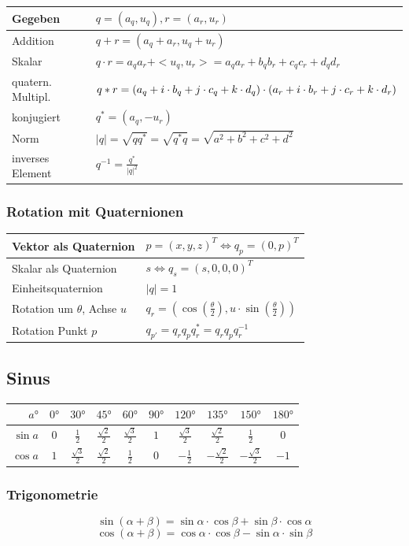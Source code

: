 \documentclass[8pt,a4paper,landscape]{scrartcl}
\begin{document}
\begin{multicols*}{3}
\begin{tabularx}{\columnwidth}{m{}|>{\raggedright\arraybackslash}X}
	Gegeben & $ q = (a_q, u_q), r=(a_r, u_r) $\\ \hline
	Addition & $ q + r = (a_q + a_r, u_q + u_r) $\\ \hline
	Skalar & $ q \cdot r = a_qa_r + <u_q, u_r> = a_qa_r + b_qb_r + c_qc_r +d_qd_r $\\ \hline
	quatern. Multipl. & $  q*r = \newline (a_q+i\cdot b_q + j\cdot c_q + k\cdot d_q)\cdot (a_r + i\cdot b_r + j\cdot c_r + k\cdot d_r) $\\ \hline
	konjugiert & $ q^{*} = (a_q, -u_r) $\\ \hline
	Norm & $ |q| = \sqrt{qq^{*}} = \sqrt{q^{*}q} = \sqrt{a^2+b^2+c^2+d^2} $\\ \hline
	inverses Element & $ q^{-1} = \frac{q^{*}}{|q|^2}$
\end{tabularx}

\subsubsection*{Rotation mit Quaternionen}
\begin{tabularx}{\columnwidth}{l|X}
	Vektor als Quaternion & $ p = (x,y,z)^T \Leftrightarrow q_p = (0, p)^T $\\ \hline
	Skalar als Quaternion & $ s \Leftrightarrow q_s = (s, 0, 0, 0)^T $\\ \hline
	Einheitsquaternion & $ |q| = 1 $\\ \hline
	Rotation um $ \theta $, Achse $ u $ & $ q_r = (\cos(\frac{\theta}{2}), u\cdot\sin(\frac{\theta}{2})) $\\ \hline
	Rotation Punkt $ p $ & $ q_{p'} = q_rq_pq_r^{*} = q_rq_pq_r^{-1} $
\end{tabularx}

\subsection*{Sinus}
\begin{tabularx}{\columnwidth}{r|c|c|c|c|c|c|c|c|c}
	$ a° $ & $ 0° $ & $ 30° $ & $ 45° $ & $ 60° $ & $ 90° $ & $ 120° $ & $ 135° $ & $ 150° $ & $ 180° $ \\ \hline
	$ \sin a$& $ 0 $& $ \frac{1}{2} $& $ \frac{\sqrt{2}}{2} $& $ \frac{\sqrt{3}}{2} $& $ 1 $& $ \frac{\sqrt{3}}{2} $& $ \frac{\sqrt{2}}{2} $& $ \frac{1}{2} $& $ 0 $\\ \hline
	$ \cos a$& $ 1 $& $ \frac{\sqrt{3}}{2} $& $ \frac{\sqrt{2}}{2} $& $ \frac{1}{2} $& $ 0 $& $ -\frac{1}{2} $& $ -\frac{\sqrt{2}}{2} $& $ -\frac{\sqrt{3}}{2} $& $ -1 $
\end{tabularx}

\subsubsection*{Trigonometrie}
$$ \sin(\alpha + \beta) = \sin\alpha \cdot \cos\beta + \sin\beta \cdot \cos\alpha $$
$$ \cos(\alpha + \beta) = \cos\alpha \cdot \cos\beta - \sin\alpha \cdot \sin\beta $$

\end{multicols*}
\end{document}
